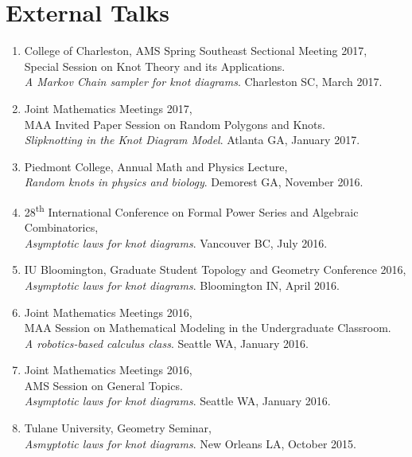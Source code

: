 \documentclass[letterpaper]{article}
\begin{document}
\section*{External Talks}

\begin{enumerate}
\item College of Charleston, AMS Spring Southeast Sectional Meeting 2017, \\
  Special Session on Knot Theory and its Applications. \\
  \textit{A Markov Chain sampler for knot diagrams}. Charleston SC, March 2017.

\item Joint Mathematics Meetings 2017, \\
  MAA Invited Paper Session on Random Polygons and Knots. \\
  \textit{Slipknotting in the Knot Diagram Model}. Atlanta GA, January 2017.

\item Piedmont College, Annual Math and Physics Lecture, \\
  \textit{Random knots in physics and biology}. Demorest GA, November 2016.

\item 28\textsuperscript{th} International Conference on Formal Power Series and
  Algebraic Combinatorics, \\
  \textit{Asymptotic laws for knot diagrams}. Vancouver BC, July 2016.

\item IU Bloomington, Graduate Student Topology and Geometry Conference 2016, \\
  \textit{Asymptotic laws for knot diagrams}. Bloomington IN, April 2016.
  
\item Joint Mathematics Meetings 2016, \\
  MAA Session on Mathematical Modeling in the Undergraduate Classroom. \\
  \textit{A robotics-based calculus class}. Seattle WA, January 2016.

\item Joint Mathematics Meetings 2016, \\
  AMS Session on General Topics. \\
  \textit{Asymptotic laws for knot diagrams}. Seattle WA, January 2016.

\item Tulane University, Geometry Seminar, \\
  \textit{Asmyptotic laws for knot diagrams}. New Orleans LA, October 2015.


\end{enumerate}
\end{document}
